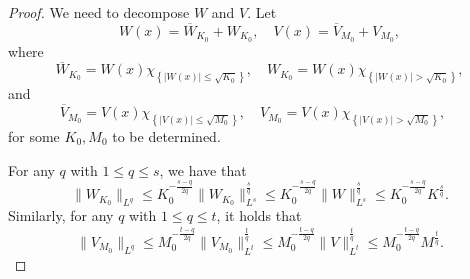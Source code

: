 \documentclass[11pt]{amsart}
\theoremstyle{plain}
\numberwithin{equation}{section}
\begin{document}
\begin{proof}
We need to decompose $W$ and $V$.
Let
$$ W(x)=\overline{W}_{K_0}+W_{K_0},   \quad  V(x)=\overline{V}_{M_0}+V_{M_0},        $$
where $${\overline{W}}_{K_0}=W(x)\chi_{{\left\{{|W(x)|\leq \sqrt{K_0}}\right\}}}, \quad
{W}_{K_0}=W(x)\chi_{{\left\{{|W(x)|>\sqrt{K_0}}\right\}}},  $$ and
$${\overline{V}}_{M_0}=V(x)\chi_{{\left\{{|V(x)|\leq \sqrt{M_0}}\right\}}}, \quad
{V}_{M_0}=V(x)\chi_{{\left\{{|V(x)|>\sqrt{M_0}}\right\}}}, \quad  $$
for some $K_0, M_0$ to be determined.

For any $q$ with $1\leq q\leq s$, we have that
\begin{equation}
\|W_{K_0}\|_{L^q}\leq
K_0^{-\frac{s-q}{2q}}\|W_{K_0}\|_{L^{s}}^{\frac{s}{q}}\leq
K_0^{-\frac{s-q}{2q}}\|W\|_{L^{s}}^{\frac{s}{q}} \leq
K_0^{-\frac{s-q}{2q}}K^{\frac{s}{q}}.
\label{mmo}
\end{equation}
Similarly, for any $q$ with $1\leq q\leq t$, it holds
that
\begin{equation}
\|V_{M_0}\|_{L^q}\leq
M_0^{-\frac{t-q}{2q}}\|V_{M_0}\|_{L^{t}}^{\frac{t}{q}}\leq
M_0^{-\frac{t-q}{2q}}\|V\|_{L^{t}}^{\frac{t}{q}} \leq
M_0^{-\frac{t-q}{2q}}M^{\frac{t}{q}}.
\label{who}
\end{equation}


\end{proof}
\end{document}
